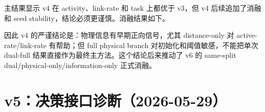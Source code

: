 \documentclass[UTF8,a4paper,11pt]{ctexart}
\newcommand{\code}[1]{\texttt{#1}}
\begin{document}
主结果显示 v4 在 activity、link-rate 和 task 上都优于 v3，但 v4 后续追加了消融和 seed stability，结论必须更谨慎。消融结果如下。

\begin{table}[H]
\centering
\small
{}
\caption{v4 physical branch 消融结果，来源为 \code{world\_model\_v4\_dual\_graph\_ablation\_report.md}。}
\end{table}

\begin{table}[H]
\centering
\small
{}
\caption{v4 seed stability 摘要，来源为 \code{world\_model\_v4\_seed\_stability\_report.md}。}
\end{table}

因此 v4 的严谨结论是：物理信息有早期正向信号，尤其 distance-only 对 active-rate/link-rate 有帮助；但 full physical branch 对初始化和阈值敏感，不能把单次 dual-full 结果直接作为最终主方法。这个结论后来推动了 v6 的 same-split dual/physical-only/information-only 正式消融。

\section{v5：决策接口诊断（2026-05-29）}
\end{document}
